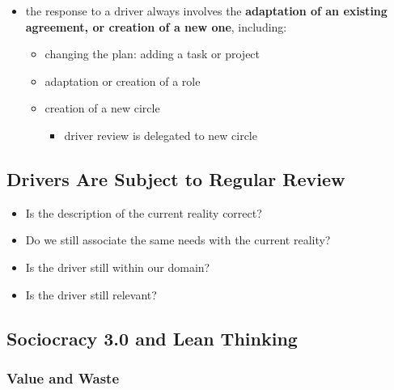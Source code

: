 \begin{itemize}
\item the response to a driver always involves the \textbf{adaptation of an existing agreement, or creation of a new one}, including:

\begin{itemize}
\item changing the plan: adding a task or project

\item adaptation or creation of a role

\item creation of a new circle

\begin{itemize}
\item driver review is delegated to new circle

\end{itemize}

\end{itemize}

\end{itemize}

\subsection{Drivers Are Subject to Regular Review}
\label{driversaresubjecttoregularreview}

\begin{itemize}
\item Is the description of the current reality correct?

\item Do we still associate the same needs with the current reality?

\item Is the driver still within our domain?

\item Is the driver still relevant?

\end{itemize}

\subsection{Sociocracy 3.0 and Lean Thinking}
\label{sociocracy3.0andleanthinking}

\subsubsection{Value and Waste}
\label{valueandwaste}

